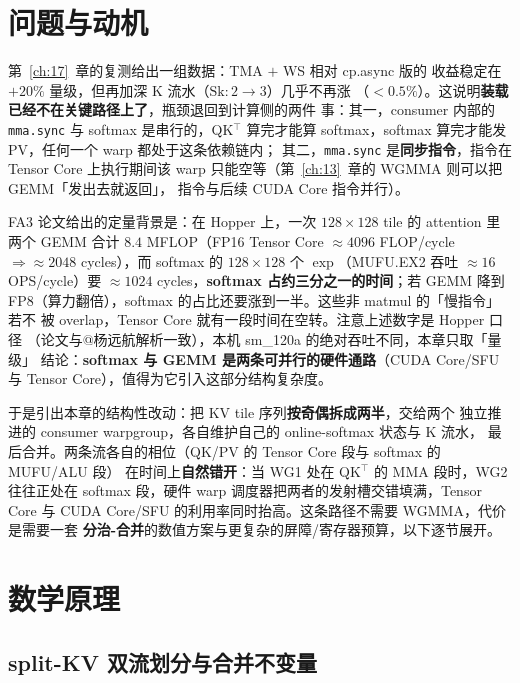 \section{问题与动机}

第~\ref{ch:17}~章的复测给出一组数据：TMA $+$ WS 相对 cp.async 版的
收益稳定在 $+20\%$ 量级，但再加深 K 流水（$\mathrm{Sk}: 2 \to 3$）几乎不再涨
（$<0.5\%$）。这说明\textbf{装载已经不在关键路径上了}，瓶颈退回到计算侧的两件
事：其一，consumer 内部的 \texttt{mma.sync} 与 softmax 是串行的，QK$^\top$
算完才能算 softmax，softmax 算完才能发 PV，任何一个 warp 都处于这条依赖链内；
其二，\texttt{mma.sync} 是\textbf{同步指令}，指令在 Tensor Core 上执行期间该
warp 只能空等（第~\ref{ch:13}~章的 WGMMA 则可以把 GEMM「发出去就返回」，
指令与后续 CUDA Core 指令并行）。

FA3 论文给出的定量背景是：在 Hopper 上，一次 $128 \times 128$ tile 的
attention 里两个 GEMM 合计 $8.4$ MFLOP（FP16 Tensor Core
$\approx 4096$ FLOP/cycle $\Rightarrow \approx 2048$ cycles），而 softmax 的
$128 \times 128$ 个 $\exp$（MUFU.EX2 吞吐 $\approx 16$ OPS/cycle）要
$\approx 1024$ cycles，\textbf{softmax 占约三分之一的时间}；若 GEMM 降到
FP8（算力翻倍），softmax 的占比还要涨到一半。这些非 matmul 的「慢指令」若不
被 overlap，Tensor Core 就有一段时间在空转。注意上述数字是 Hopper 口径
（论文与@杨远航解析一致），本机 sm\_120a 的绝对吞吐不同，本章只取「量级」
结论：\textbf{softmax 与 GEMM 是两条可并行的硬件通路}（CUDA Core/SFU 与
Tensor Core），值得为它引入这部分结构复杂度。

于是引出本章的结构性改动：把 KV tile 序列\textbf{按奇偶拆成两半}，交给两个
独立推进的 consumer warpgroup，各自维护自己的 online-softmax 状态与 K 流水，
最后合并。两条流各自的相位（QK/PV 的 Tensor Core 段与 softmax 的 MUFU/ALU 段）
在时间上\textbf{自然错开}：当 WG1 处在 QK$^\top$ 的 MMA 段时，WG2 往往正处在
softmax 段，硬件 warp 调度器把两者的发射槽交错填满，Tensor Core 与
CUDA Core/SFU 的利用率同时抬高。这条路径不需要 WGMMA，代价是需要一套
\textbf{分治-合并}的数值方案与更复杂的屏障/寄存器预算，以下逐节展开。

\section{数学原理}

\subsection{split-KV 双流划分与合并不变量}

